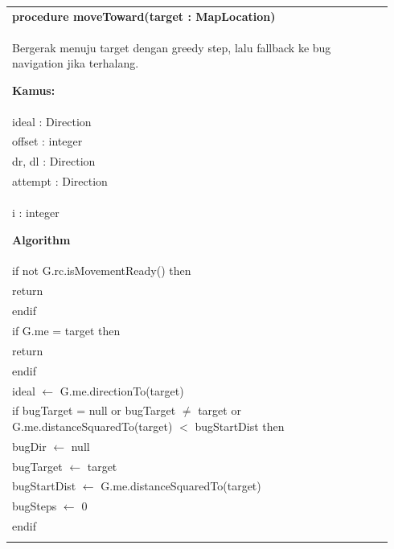 \documentclass{article}
\newenvironment{pseudobox}
{
\centering
\begin{longtable}{|p{0.94\linewidth}|}
\hline
}
{
\\ \hline
\end{longtable}
\vspace{0.05cm}
}
\begin{document}
\begin{pseudobox}
\textbf{procedure moveToward(target : MapLocation)} \\
{ Bergerak menuju target dengan greedy step, lalu fallback ke bug navigation jika terhalang. }

\textbf{Kamus:} \\
\hspace*{1em} ideal : Direction \\
\hspace*{1em} offset : integer \\
\hspace*{1em} dr, dl : Direction \\
\hspace*{1em} attempt : Direction \\
\hspace*{1em} i : integer

\textbf{Algorithm} \\
\hspace*{1em} if not G.rc.isMovementReady() then \\
\hspace*{2em} return \\
\hspace*{1em} endif \\

\hspace*{1em} if G.me = target then \\
\hspace*{2em} return \\
\hspace*{1em} endif \\

\hspace*{1em} ideal $\leftarrow$ G.me.directionTo(target) \\

\hspace*{1em} if bugTarget = null or bugTarget $\neq$ target or G.me.distanceSquaredTo(target) $<$ bugStartDist then \\
\hspace*{2em} bugDir $\leftarrow$ null \\
\hspace*{2em} bugTarget $\leftarrow$ target \\
\hspace*{2em} bugStartDist $\leftarrow$ G.me.distanceSquaredTo(target) \\
\hspace*{2em} bugSteps $\leftarrow$ 0 \\
\hspace*{1em} endif \\


\end{pseudobox}
\end{document}
